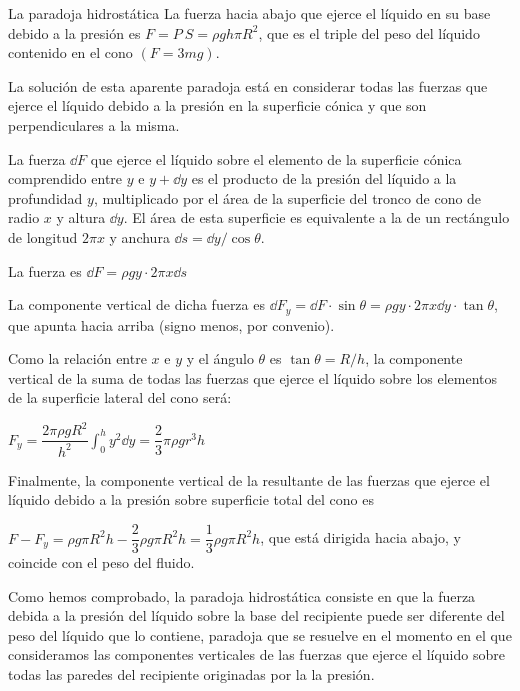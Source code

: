 \begin{myblock}{La paradoja hidrostática}
\vspace{2mm} La fuerza hacia abajo que ejerce el líquido en su base debido a la presión es $F=P\ S=\rho g h \pi R^2$, que es el triple del peso del líquido contenido en el cono $(F=3mg)$.

\vspace{2mm} La solución de esta aparente paradoja está en considerar todas las fuerzas que ejerce el líquido debido a la presión en la superficie cónica y que son perpendiculares a la misma.



\vspace{2mm} La fuerza $\dd F$ que ejerce el líquido sobre el elemento de la superficie cónica comprendido entre $y$ e $ y+ \dd y$ es el producto de la presión del líquido a la profundidad $y$, multiplicado por el área de la superficie del tronco de cono de radio $x$ y altura $\dd y$. El área de esta superficie es equivalente a la de un rectángulo de longitud $2\pi x$  y anchura $\dd s=\dd y / \cos \theta$.

\vspace{2mm} La fuerza es $\dd F=\rho g y \cdot 2 \pi x \dd s$

\vspace{2mm} La componente vertical de dicha fuerza es $\dd F_y= \dd F \cdot \sin \theta= \rho g y \cdot 2 \pi x \dd y \cdot \tan \theta$, que apunta hacia arriba (signo menos, por convenio).

\vspace{2mm} Como la relación entre $x $ e $y$  y el ángulo $\theta$  es  $\tan \theta=R/h$, la componente vertical de la suma de todas las fuerzas que ejerce el líquido sobre los elementos de la superficie lateral del cono será:

\vspace{2mm} $F_y=\displaystyle \dfrac{2 \pi \rho g R^2}{h^2} \int_0^h y^2 \dd y = \dfrac 2 3 \pi \rho g r^3 h$

\vspace{2mm} Finalmente, la componente vertical de la resultante de las fuerzas que ejerce el líquido debido a la presión sobre superficie total del cono es


$F-F_y=\rho g \pi R^2 h-\dfrac 2 3 \rho g \pi R^2 h=\dfrac 1 3 \rho g \pi R^2 h$,
que está dirigida hacia abajo, y coincide con el peso del fluido.

\vspace{2mm} Como hemos comprobado, la paradoja hidrostática consiste en que la fuerza debida a la presión del líquido sobre la base del recipiente puede ser diferente del peso del líquido que lo contiene, paradoja que se resuelve en el momento en el que consideramos las componentes verticales de las fuerzas que ejerce el líquido sobre todas las paredes del recipiente originadas por la la presión.

\end{myblock}




